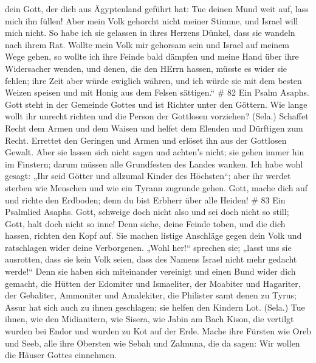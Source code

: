 dein Gott, der dich aus Ägyptenland geführt hat: Tue deinen Mund weit
auf, lass mich ihn füllen!  Aber mein Volk gehorcht nicht
meiner Stimme, und Israel will mich nicht.  So habe ich sie
gelassen in ihres Herzens Dünkel, dass sie wandeln nach ihrem Rat.
 Wollte mein Volk mir gehorsam sein und Israel auf meinem
Wege gehen,  so wollte ich ihre Feinde bald dämpfen und
meine Hand über ihre Widersacher wenden,  und denen, die
den HErrn hassen, müsste es wider sie fehlen; ihre Zeit aber würde
ewiglich währen,  und ich würde sie mit dem besten Weizen
speisen und mit Honig aus dem Felsen sättigen.`` \# 82  Ein
Psalm Asaphs. Gott steht in der Gemeinde Gottes und ist Richter unter
den Göttern.  Wie lange wollt ihr unrecht richten und die
Person der Gottlosen vorziehen? (Sela.)  Schaffet Recht dem
Armen und dem Waisen und helfet dem Elenden und Dürftigen zum Recht.
 Errettet den Geringen und Armen und erlöset ihn aus der
Gottlosen Gewalt.  Aber sie lassen sich nicht sagen und
achten's nicht; sie gehen immer hin im Finstern; darum müssen alle
Grundfesten des Landes wanken.  Ich habe wohl gesagt: „Ihr
seid Götter und allzumal Kinder des Höchsten``;  aber ihr
werdet sterben wie Menschen und wie ein Tyrann zugrunde gehen.
 Gott, mache dich auf und richte den Erdboden; denn du bist
Erbherr über alle Heiden! \# 83  Ein Psalmlied Asaphs.
 Gott, schweige doch nicht also und sei doch nicht so still;
Gott, halt doch nicht so inne!  Denn siehe, deine Feinde
toben, und die dich hassen, richten den Kopf auf.  Sie
machen listige Anschläge gegen dein Volk und ratschlagen wider deine
Verborgenen.  „Wohl her!{}`` sprechen sie; „lasst uns sie
ausrotten, dass sie kein Volk seien, dass des Namens Israel nicht mehr
gedacht werde!{}``  Denn sie haben sich miteinander
vereinigt und einen Bund wider dich gemacht,  die Hütten der
Edomiter und Ismaeliter, der Moabiter und Hagariter,  der
Gebaliter, Ammoniter und Amalekiter, die Philister samt denen zu Tyrus;
 Assur hat sich auch zu ihnen geschlagen; sie helfen den
Kindern Lot. (Sela.)  Tue ihnen, wie den Midianitern, wie
Sisera, wie Jabin am Bach Kison,  die vertilgt wurden bei
Endor und wurden zu Kot auf der Erde.  Mache ihre Fürsten
wie Oreb und Seeb, alle ihre Obersten wie Sebah und Zalmuna,
 die da sagen: Wir wollen die Häuser Gottes einnehmen.

